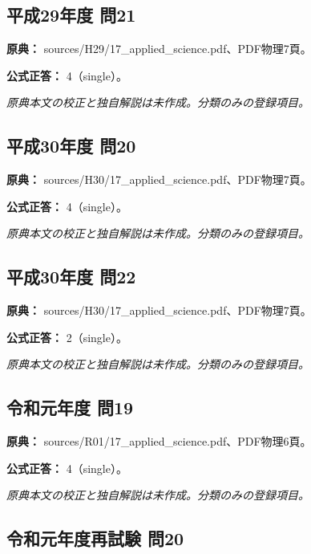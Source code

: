 \subsection{平成29年度 問21}
\label{q:h29-reg-applied-21}

\noindent\textbf{原典：} sources/H29/17\_applied\_science.pdf、PDF物理7頁。

\textbf{公式正答：} 4（single）。

\par\textit{原典本文の校正と独自解説は未作成。分類のみの登録項目。}

\subsection{平成30年度 問20}
\label{q:h30-reg-applied-20}

\noindent\textbf{原典：} sources/H30/17\_applied\_science.pdf、PDF物理7頁。

\textbf{公式正答：} 4（single）。

\par\textit{原典本文の校正と独自解説は未作成。分類のみの登録項目。}

\subsection{平成30年度 問22}
\label{q:h30-reg-applied-22}

\noindent\textbf{原典：} sources/H30/17\_applied\_science.pdf、PDF物理7頁。

\textbf{公式正答：} 2（single）。

\par\textit{原典本文の校正と独自解説は未作成。分類のみの登録項目。}

\subsection{令和元年度 問19}
\label{q:r01-reg-applied-19}

\noindent\textbf{原典：} sources/R01/17\_applied\_science.pdf、PDF物理6頁。

\textbf{公式正答：} 4（single）。

\par\textit{原典本文の校正と独自解説は未作成。分類のみの登録項目。}

\subsection{令和元年度再試験 問20}
\label{q:r01-ret-applied-20}

